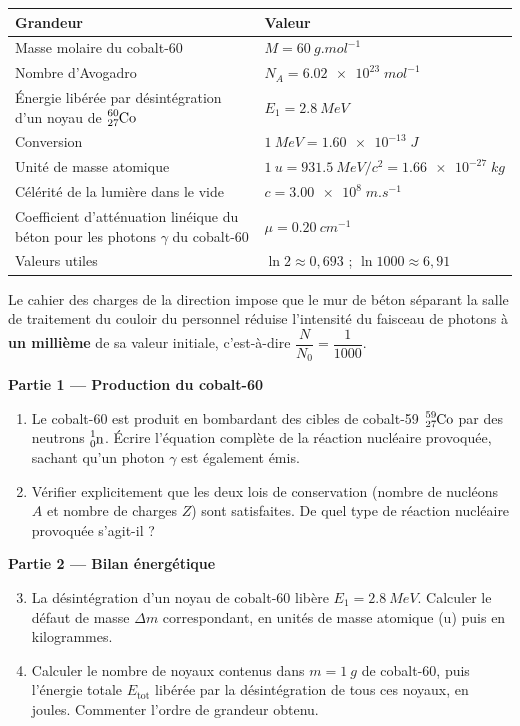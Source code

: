 \documentclass[11pt]{article}
\newcounter{popsec}
\newcounter{popsub}
\newcommand{\courssub}[1]{%
  \stepcounter{popsub}%
  \par\vspace{9pt}\noindent{\popxbold\fontsize{11.5}{13}\selectfont\color{popink}{\color{poporange}\thepopsec.\thepopsub}\hspace{6pt}#1}\par\nopagebreak\vspace{4pt}
}
\begin{document}
\begin{center}
\begin{tabularx}{\linewidth}{|l|X|}
\hline
\rowcolor{popblueL} Grandeur & Valeur \\
\hline
Masse molaire du cobalt-60 & $M = \SI{60}{g.mol^{-1}}$ \\
\hline
Nombre d'Avogadro & $N_{A} = \num{6,02e23} \; \si{mol^{-1}}$ \\
\hline
Énergie libérée par désintégration d'un noyau de $\ce{^{60}_{27}Co}$ & $E_{1} = \SI{2,8}{MeV}$ \\
\hline
Conversion & $\SI{1}{MeV} = \num{1,60e-13} \; \si{J}$ \\
\hline
Unité de masse atomique & $\SI{1}{u} = \SI{931,5}{MeV/c^{2}} = \num{1,66e-27} \; \si{kg}$ \\
\hline
Célérité de la lumière dans le vide & $c = \num{3,00e8} \; \si{m.s^{-1}}$ \\
\hline
Coefficient d'atténuation linéique du béton pour les photons $\gamma$ du cobalt-60 & $\mu = \SI{0,20}{cm^{-1}}$ \\
\hline
Valeurs utiles & $\ln 2 \approx 0,693$ ; $\ln 1000 \approx 6,91$ \\
\hline
\end{tabularx}
\end{center}

Le cahier des charges de la direction impose que le mur de béton séparant la salle de traitement du couloir du personnel réduise l'intensité du faisceau de photons à \textbf{un millième} de sa valeur initiale, c'est-à-dire $\dfrac{N}{N_{0}} = \dfrac{1}{1000}$.

\courssub{Consignes}

\textbf{Partie 1 — Production du cobalt-60}

\begin{enumerate}
\item Le cobalt-60 est produit en bombardant des cibles de cobalt-59 $\ce{^{59}_{27}Co}$ par des neutrons $\ce{^{1}_{0}n}$. Écrire l'équation complète de la réaction nucléaire provoquée, sachant qu'un photon $\gamma$ est également émis.
\item Vérifier explicitement que les deux lois de conservation (nombre de nucléons $A$ et nombre de charges $Z$) sont satisfaites. De quel type de réaction nucléaire provoquée s'agit-il ?
\end{enumerate}

\textbf{Partie 2 — Bilan énergétique}

\begin{enumerate}
\setcounter{enumi}{2}
\item La désintégration d'un noyau de cobalt-60 libère $E_{1} = \SI{2,8}{MeV}$. Calculer le défaut de masse $\Delta m$ correspondant, en unités de masse atomique (u) puis en kilogrammes.
\item Calculer le nombre de noyaux contenus dans $m = \SI{1}{g}$ de cobalt-60, puis l'énergie totale $E_{\text{tot}}$ libérée par la désintégration de tous ces noyaux, en joules. Commenter l'ordre de grandeur obtenu.
\end{enumerate}
\end{document}
